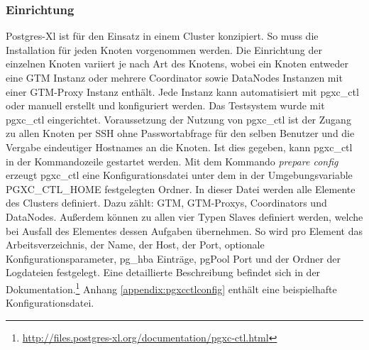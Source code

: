 \subsubsection{Einrichtung}
Postgres-Xl ist für den Einsatz in einem Cluster konzipiert.
So muss die Installation für jeden Knoten vorgenommen werden.
Die Einrichtung der einzelnen Knoten variiert je nach Art des Knotens, wobei ein Knoten entweder eine GTM Instanz oder mehrere Coordinator sowie DataNodes Instanzen mit einer GTM-Proxy Instanz enthält.
Jede Instanz kann automatisiert mit pgxc\_{}ctl oder manuell erstellt und konfiguriert werden.
Das Testsystem wurde mit pgxc\_{}ctl eingerichtet.
Voraussetzung der Nutzung von pgxc\_{}ctl ist der Zugang zu allen Knoten per SSH ohne Passwortabfrage für den selben Benutzer und die Vergabe eindeutiger Hostnames an die Knoten.
Ist dies gegeben, kann pgxc\_{}ctl in der Kommandozeile gestartet werden.
Mit dem Kommando \textit{prepare config} erzeugt pgxc\_{}ctl eine Konfigurationsdatei unter dem in der Umgebungsvariable PGXC\_{}CTL\_{}HOME festgelegten Ordner.
In dieser Datei werden alle Elemente des Clusters definiert.
Dazu zählt: GTM, GTM-Proxys, Coordinators und DataNodes.
Außerdem können zu allen vier Typen Slaves definiert werden, welche bei Ausfall des Elementes dessen Aufgaben übernehmen.
So wird pro Element das Arbeitsverzeichnis, der Name, der Host, der Port, optionale Konfigurationsparameter, pg\_{}hba Einträge, pgPool Port und der Ordner der Logdateien festgelegt.
Eine detaillierte Beschreibung befindet sich in der Dokumentation.\footnote{\url{http://files.postgres-xl.org/documentation/pgxc-ctl.html}}
Anhang \ref{appendix:pgxcctlconfig} enthält eine beispielhafte Konfigurationsdatei.

